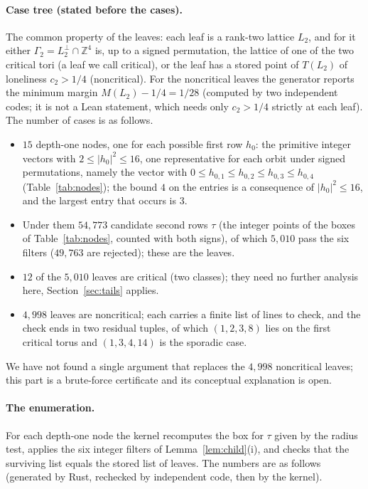 \documentclass[11pt]{article}
\theoremstyle{remark}
\newcommand{\Z}{\mathbb{Z}}
\begin{document}
\paragraph{Case tree (stated before the cases).} The common property of the leaves: each leaf is a rank-two lattice $L_2$, and for it either $\Gamma_2=L_2^\perp\cap\Z^4$ is, up to a signed permutation, the lattice of one of the two critical tori (a leaf we call critical), or the leaf has a stored point of $T(L_2)$ of loneliness $c_2>1/4$ (noncritical). For the noncritical leaves the generator reports the minimum margin $M(L_2)-1/4=1/28$ (computed by two independent codes; it is not a Lean statement, which needs only $c_2>1/4$ strictly at each leaf). The number of cases is as follows.
\begin{itemize}
\item $15$ depth-one nodes, one for each possible first row $h_0$: the primitive integer vectors with $2\le|h_0|^2\le16$, one representative for each orbit under signed permutations, namely the vector with $0\le h_{0,1}\le h_{0,2}\le h_{0,3}\le h_{0,4}$ (Table~\ref{tab:nodes}); the bound $4$ on the entries is a consequence of $|h_0|^2\le16$, and the largest entry that occurs is $3$.
\item Under them $54{,}773$ candidate second rows $\tau$ (the integer points of the boxes of Table~\ref{tab:nodes}, counted with both signs), of which $5{,}010$ pass the six filters ($49{,}763$ are rejected); these are the leaves.
\item $12$ of the $5{,}010$ leaves are critical (two classes); they need no further analysis here, Section~\ref{sec:tails} applies.
\item $4{,}998$ leaves are noncritical; each carries a finite list of lines to check, and the check ends in two residual tuples, of which $(1,2,3,8)$ lies on the first critical torus and $(1,3,4,14)$ is the sporadic case.
\end{itemize}
We have not found a single argument that replaces the $4{,}998$ noncritical leaves; this part is a brute-force certificate and its conceptual explanation is open.

\paragraph{The enumeration.} For each depth-one node the kernel recomputes the box for $\tau$ given by the radius test, applies the six integer filters of Lemma~\ref{lem:child}(i), and checks that the surviving list equals the stored list of leaves. The numbers are as follows (generated by Rust, rechecked by independent code, then by the kernel).
\end{document}

